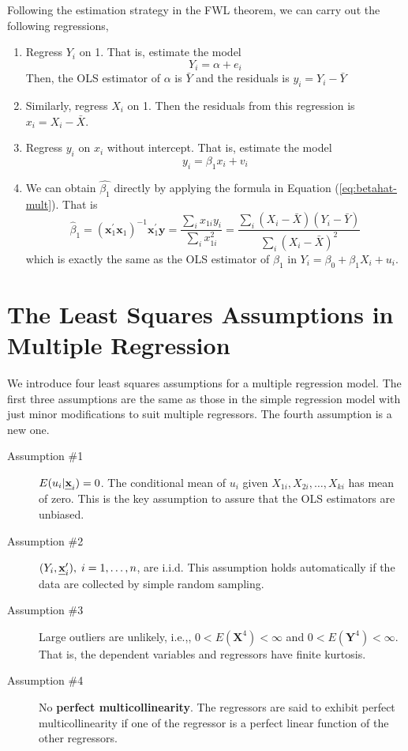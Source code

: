 \documentclass[a4paper,11pt]{article}
\def\mathbi#1{\textbf{\em #1}}
\begin{document}
Following the estimation strategy in the FWL theorem, we can carry out
the following regressions,
\begin{enumerate}
\item Regress \(Y_i\) on 1. That is, estimate the model
\[ Y_i = \alpha + e_i \]
Then, the OLS estimator of \(\alpha\) is
\(\bar{Y}\) and the residuals is \(y_i = Y_i - \bar{Y}\)
\item Similarly, regress \(X_{i}\) on 1. Then
the residuals from this regression is \(x_{i} = X_{i} -
   \bar{X}\).
\item Regress \(y_i\) on \(x_{i}\) without intercept. That is,
estimate the model
\[ y_i = \beta_1 x_{i} + v_i \]
\item We can obtain \(\hat{\beta_1}\) directly by applying the formula in
Equation (\ref{eq:betahat-mult}). That is 
\[ \hat{\beta}_1 = (\mathbf{x}_1^{\prime} \mathbf{x}_1)^{-1}
   \mathbf{x}_1^{\prime} \mathbf{y} = \frac{\sum_i x_{1i} y_i}{\sum_i
   x_{1i}^2} = \frac{\sum_i (X_i-\bar{X})(Y_i-\bar{Y})}{\sum_i(X_i-\bar{X})^2} \] 
which is exactly the same as the OLS estimator of \(\beta_1\) in \(Y_i
   = \beta_0 + \beta_1 X_i + u_i\).
\end{enumerate}


\section{The Least Squares Assumptions in Multiple Regression}
\label{sec:org3dec89b}

We introduce four least squares assumptions for a multiple regression
model. The first three assumptions are the same as those in the
simple regression model with just minor modifications to suit multiple
regressors. The fourth assumption is a new one. 

\begin{description}
\item[{Assumption \#1}] \(E(u_i | \mathbi{x}_i) = 0\). The conditional mean
of \(u_i\) given \(X_{1i}, X_{2i}, \ldots, X_{ki}\) has
mean of zero. This is the key assumption to assure
that the OLS estimators are unbiased.

\item[{Assumption \#2}] \((Y_i, \mathbi{x}_i^{\prime}),\; i=1, \ldots, n\), are
i.i.d. This assumption holds automatically if the
data are collected by simple random sampling.

\item[{Assumption \#3}] Large outliers are unlikely, i.e.,, \(0 <
                   E(\mathbf{X}^4) < \infty\) and \(0 < E(\mathbf{Y}^4)
                   < \infty\). That is, the dependent variables and
regressors have finite kurtosis.
\item[{Assumption \#4}] No \textbf{perfect multicollinearity}. The regressors are
said to exhibit perfect multicollinearity if one of
the regressor is a perfect linear function of the
other regressors.
\end{description}
\end{document}
